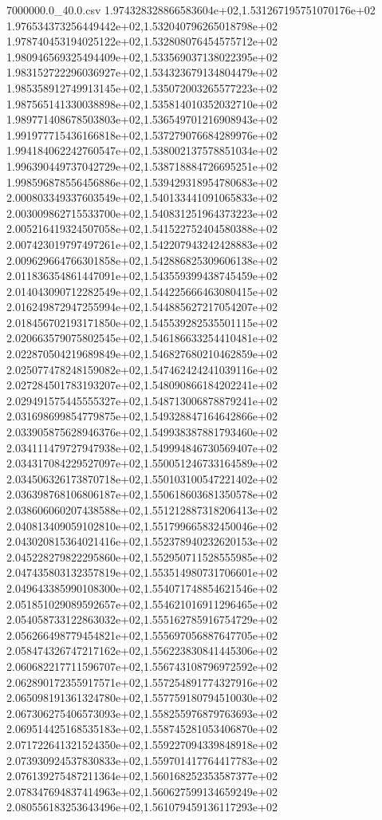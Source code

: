 \begin{filecontents*}{7000000.0_40.0.csv}
1.974328328866583604e+02,1.531267195751070176e+02
1.976534373256449442e+02,1.532040796265018798e+02
1.978740453194025122e+02,1.532808076454575712e+02
1.980946569325494409e+02,1.533569037138022395e+02
1.983152722296036927e+02,1.534323679134804479e+02
1.985358912749913145e+02,1.535072003265577223e+02
1.987565141330038898e+02,1.535814010352032710e+02
1.989771408678503803e+02,1.536549701216908943e+02
1.991977715436166818e+02,1.537279076684289976e+02
1.994184062242760547e+02,1.538002137578851034e+02
1.996390449737042729e+02,1.538718884726695251e+02
1.998596878556456886e+02,1.539429318954780683e+02
2.000803349337603549e+02,1.540133441091065833e+02
2.003009862715533700e+02,1.540831251964373223e+02
2.005216419324507058e+02,1.541522752404580388e+02
2.007423019797497261e+02,1.542207943242428883e+02
2.009629664766301858e+02,1.542886825309606138e+02
2.011836354861447091e+02,1.543559399438745459e+02
2.014043090712282549e+02,1.544225666463080415e+02
2.016249872947255994e+02,1.544885627217054207e+02
2.018456702193171850e+02,1.545539282535501115e+02
2.020663579075802545e+02,1.546186633254410481e+02
2.022870504219689849e+02,1.546827680210462859e+02
2.025077478248159082e+02,1.547462424241039116e+02
2.027284501783193207e+02,1.548090866184202241e+02
2.029491575445555327e+02,1.548713006878879241e+02
2.031698699854779875e+02,1.549328847164642866e+02
2.033905875628946376e+02,1.549938387881793460e+02
2.034111479727947938e+02,1.549994846730569407e+02
2.034317084229527097e+02,1.550051246733164589e+02
2.034506326173870718e+02,1.550103100547221402e+02
2.036398768106806187e+02,1.550618603681350578e+02
2.038606060207438588e+02,1.551212887318206413e+02
2.040813409059102810e+02,1.551799665832450046e+02
2.043020815364021416e+02,1.552378940232620153e+02
2.045228279822295860e+02,1.552950711528555985e+02
2.047435803132357819e+02,1.553514980731706601e+02
2.049643385990108300e+02,1.554071748854621546e+02
2.051851029089592657e+02,1.554621016911296465e+02
2.054058733122863032e+02,1.555162785916754729e+02
2.056266498779454821e+02,1.555697056887647705e+02
2.058474326747217162e+02,1.556223830841445306e+02
2.060682217711596707e+02,1.556743108796972592e+02
2.062890172355917571e+02,1.557254891774327916e+02
2.065098191361324780e+02,1.557759180794510030e+02
2.067306275406573093e+02,1.558255976879763693e+02
2.069514425168535183e+02,1.558745281053406870e+02
2.071722641321524350e+02,1.559227094339848918e+02
2.073930924537830833e+02,1.559701417764417783e+02
2.076139275487211364e+02,1.560168252353587377e+02
2.078347694837414963e+02,1.560627599134659249e+02
2.080556183253643496e+02,1.561079459136117293e+02

\end{filecontents*}

